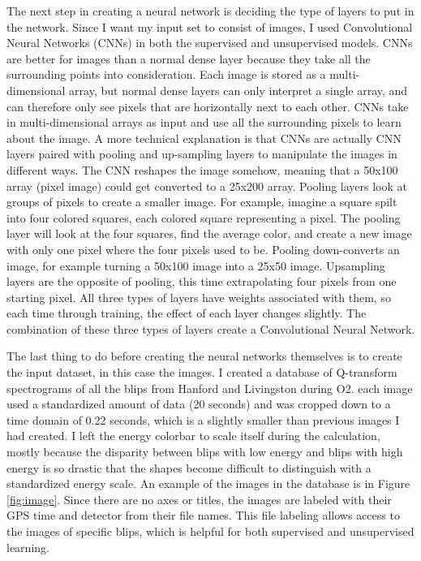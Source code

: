 \documentclass[a4paper]{article}
\begin{document}
The next step in creating a neural network is deciding the type of layers to put in the network. Since I want my input set to consist of images, I used Convolutional Neural Networks (CNNs) in both the supervised and unsupervised models. CNNs are better for images than a normal dense layer because they take all the surrounding points into consideration. Each image is stored as a multi-dimensional array, but normal dense layers can only interpret a single array, and can therefore only see pixels that are horizontally next to each other. CNNs take in multi-dimensional arrays as input and use all the surrounding pixels to learn about the image. A more technical explanation is that CNNs are actually CNN layers paired with pooling and up-sampling layers to manipulate the images in different ways. The CNN reshapes the image somehow, meaning that a 50x100 array (pixel image) could get converted to a 25x200 array. Pooling layers look at groups of pixels to create a smaller image. For example, imagine a square spilt into four colored squares, each colored square representing a pixel. The pooling layer will look at the four squares, find the average color, and create a new image with only one pixel where the four pixels used to be. Pooling down-converts an image, for example turning a 50x100 image into a 25x50 image. Upsampling layers are the opposite of pooling, this time extrapolating four pixels from one starting pixel. All three types of layers have weights associated with them, so each time through training, the effect of each layer changes slightly. The combination of these three types of layers create a Convolutional Neural Network.

The last thing to do before creating the neural networks themselves is to create the input dataset, in this case the images. I created a database of Q-transform spectrograms of all the blips from Hanford and Livingston during O2. each image used a standardized amount of data (20 seconds) and was cropped down to a time domain of 0.22 seconds, which is a slightly smaller than previous images I had created. I left the energy colorbar to scale itself during the calculation, mostly because the disparity between blips with low energy and blips with high energy is so drastic that the shapes become difficult to distinguish with a standardized energy scale. An example of the images in the database is in Figure \ref{fig:image}. Since there are no axes or titles, the images are labeled with their GPS time and detector from their file names. This file labeling allows access to the images of specific blips, which is helpful for both supervised and unsupervised learning.
\end{document}
